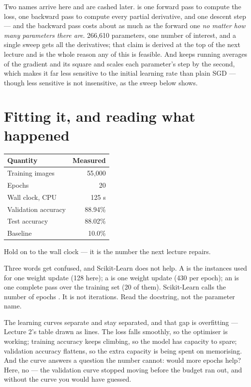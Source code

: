 \documentclass[11pt,a4paper]{article}
\begin{document}
Two names arrive here and are cashed later.  is one
forward pass to compute the loss, one backward pass to compute every partial
derivative, and one descent step --- and the backward pass costs about as much
as the forward one \emph{no matter how many parameters there are}. 266{,}610
parameters, one number of interest, and a single sweep gets all the
derivatives; that claim is derived at the top of the next lecture and is the
whole reason any of this is feasible. And  keeps running averages of
the gradient and its square and scales each parameter's step by the second,
which makes it far less sensitive to the initial learning rate than plain SGD
--- though less sensitive is not insensitive, as the sweep below shows.

\section{Fitting it, and reading what happened}

\begin{center}
\small
\begin{tabular}{lr}
\toprule
\textbf{Quantity} & \textbf{Measured} \\
\midrule
Training images & 55{,}000 \\
Epochs & 20 \\
Wall clock, CPU & 125 s \\
Validation accuracy & 88.94\% \\
Test accuracy & 88.02\% \\
Baseline & 10.0\% \\
\bottomrule
\end{tabular}
\end{center}

Hold on to the wall clock --- it is the number the next lecture repairs.

Three words get confused, and Scikit-Learn does not help. A  is the
instances used for one weight update (128 here); a  is one weight
update (430 per epoch); an  is one complete pass over the training
set (20 of them). Scikit-Learn calls the number of epochs . It
is not iterations. Read the docstring, not the parameter name.

The learning curves separate and stay separated, and that gap is overfitting
--- Lecture 2's table drawn as lines. The loss falls smoothly, so the optimiser
is working; training accuracy keeps climbing, so the model has capacity to
spare; validation accuracy flattens, so the extra capacity is being spent on
memorising. And the curve answers a question the number cannot: would more
epochs help? Here, no --- the validation curve stopped moving before the budget
ran out, and without the curve you would have guessed.
\end{document}
